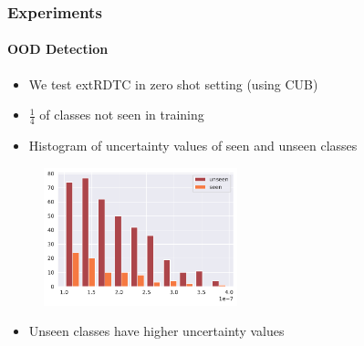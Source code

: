 \documentclass[9pt]{beamer}
\begin{document}
\begin{frame}
\frametitle{Experiments}
\framesubtitle{OOD Detection}
\begin{itemize}
	\item We test extRDTC in zero shot setting (using CUB)
	\item $\frac{1}{4}$ of classes not seen in training
	\item Histogram of uncertainty values of seen and unseen classes
\end{itemize}
\begin{figure}
	\centering
	\includegraphics[width=0.5\textwidth]{images/zero_shot_class_uncertainty_median_hist.pdf}
\end{figure}
\begin{itemize}
	\item Unseen classes have higher uncertainty values
\end{itemize}
\end{frame} 
\end{document}
